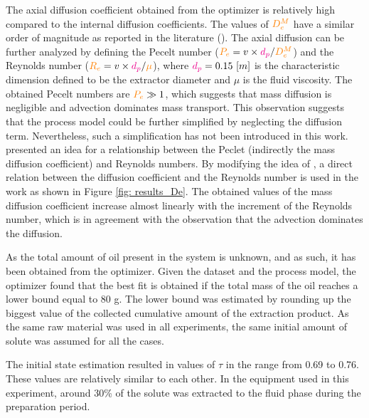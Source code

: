 \documentclass[../Article_Model_Parameters.tex]{subfiles}
\begin{document}
	The axial diffusion coefficient obtained from the optimizer is relatively high compared to the internal diffusion coefficients. The values of ${\color{orange}D_e^M}$ have a similar order of magnitude as reported in the literature (\citet{ReisVasco2000}). %
	The axial diffusion can be further analyzed by defining the Pecelt number (${\color{orange}P_e} = v \times {\color{magenta}d_p} / {\color{orange}D_e^M} $) and the Reynolds number (${\color{orange}R_e} = v \times {\color{magenta}d_p} / {\color{orange}\mu} $), where ${\color{magenta}d_p}=0.15~[m]$ is the characteristic dimension defined to be the extractor diameter and $\mu$ is the fluid viscosity. %
	The obtained Pecelt numbers are ${\color{orange}P_e} \gg 1$, which suggests that mass diffusion is negligible and advection dominates mass transport. This observation suggests that the process model could be further simplified by neglecting the diffusion term. Nevertheless, such a simplification has not been introduced in this work.
	\citet{Chung1968} presented an idea for a relationship between the Peclet (indirectly the mass diffusion coefficient) and Reynolds numbers. By modifying the idea of \citet{Chung1968}, a direct relation between the diffusion coefficient and the Reynolds number is used in the work as shown in Figure \ref{fig: results_De}. The obtained values of the mass diffusion coefficient increase almost linearly with the increment of the Reynolds number, which is in agreement with the observation that the advection dominates the diffusion.
	
	As the total amount of oil present in the system is unknown, and as such, it has been obtained from the optimizer. Given the dataset and the process model, the optimizer found that the best fit is obtained if the total mass of the oil reaches a lower bound equal to 80 g. The lower bound was estimated by rounding up the biggest value of the collected cumulative amount of the extraction product. As the same raw material was used in all experiments, the same initial amount of solute was assumed for all the cases.
	
	The initial state estimation resulted in values of $\tau$ in the range from 0.69 to 0.76. These values are relatively similar to each other. In the equipment used in this experiment, around 30\% of the solute was extracted to the fluid phase during the preparation period. 
	
\end{document}
